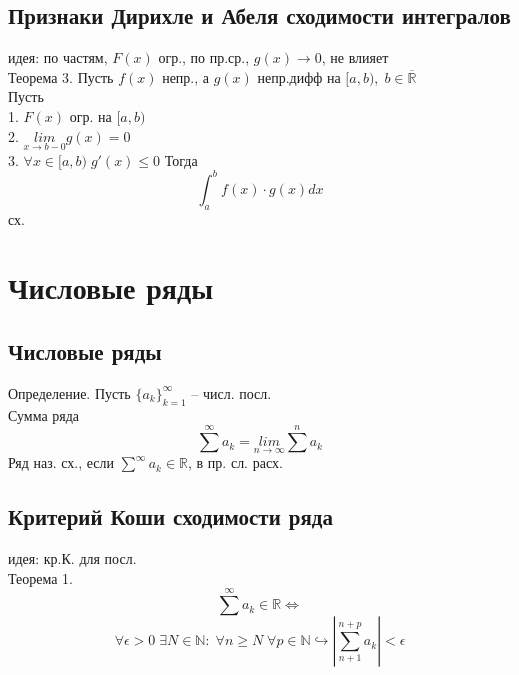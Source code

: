 \documentclass{article}
\begin{document}
\subsection{Признаки Дирихле и Абеля сходимости интегралов}
идея: по частям, $F(x)$ огр., по пр.ср., $g(x) \rightarrow 0$, не влияет \\
Теорема 3. Пусть $f(x)$ непр., а $g(x)$ непр.дифф на $[a,b), \; b \in \overline{\mathbb R}$ \\
Пусть \\
1. $F(x)$ огр. на $[a,b)$ \\
2. $\underset{x \rightarrow b-0}{lim} g(x) = 0$ \\
3. $\forall x \in [a,b) \; g'(x) \leq 0$
Тогда \\
\begin{equation*}
    \int_a^b f(x) \cdot g(x) dx
\end{equation*}
сх. \\

\section{Числовые ряды}
\subsection{Числовые ряды}
Определение. Пусть $\{ a_k \}_{k=1}^{\infty}$ -- числ. посл. \\
Сумма ряда
\begin{equation*}
    \sum^\infty a_k = \underset{n \rightarrow \infty}{lim} \sum^n a_k
\end{equation*}
Ряд наз. сх., если $\overset{\infty}{\sum} a_k \in \mathbb R$, в пр. сл. расх.
\subsection{Критерий Коши сходимости ряда}
идея: кр.К. для посл. \\
Теорема 1.
\begin{equation*}
    \overset{\infty}{\sum} a_k \in \mathbb R \Leftrightarrow
\end{equation*}
\begin{equation*}
    \forall \epsilon > 0 \; \exists N \in \mathbb N: \; \forall n \geq N \; \forall p \in \mathbb N \hookrightarrow |\sum_{n+1}^{n+p} a_k| < \epsilon
\end{equation*}
\end{document}
